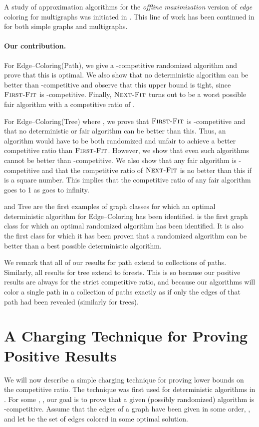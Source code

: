 \documentclass[smallextended]{svjour3}
\def\mck{{\sc Edge--Coloring}\xspace}
\def\mcpath{{\sc Edge--Coloring(Path)}\xspace}
\def\mctree{{\sc Edge--Coloring(Tree)}\xspace}
\def\paths{\text{\sc Path}\xspace}
\newcommand{\NF}{\ensuremath{\operatorname{\textsc{Next-Fit}}}\xspace}
\newcommand{\FF}{\ensuremath{\operatorname{\textsc{First-Fit}}}\xspace}
\begin{document}
A study of approximation algorithms for the {\em offline maximization} version of {\em edge} coloring for multigraphs was initiated in \cite{Faprox}. This line of work has been continued in \cite{aprox1, aprox2, aprox3SIDMA, aprox6} for both simple graphs and multigraphs.

\paragraph{Our contribution.}
For \mcpath, we give a -competitive randomized algorithm and
prove that this is optimal. We also show that no deterministic
algorithm can be better than -competitive and observe that
this upper bound is tight, since \FF is -competitive. 
Finally, \NF turns out to be a worst possible fair algorithm with a competitive ratio of .

For \mctree where , we prove that \FF is
-competitive and that no deterministic or fair
algorithm can be better than this.
Thus, an algorithm would have to be both randomized and unfair to
achieve a better competitive ratio than \FF.
However, we show that even such algorithms cannot be better than
-competitive. 
We also show that
any fair algorithm is -competitive
and that the competitive ratio of \NF is no better than this if  is
a square number.
This implies that the competitive ratio of any fair algorithm goes to
 1 as  goes to infinity.

\paths and {\sc Tree} are the first examples of graph classes
for which 
 an optimal deterministic algorithm for \mck has been identified.
\paths is the first graph class for which an optimal randomized
 algorithm has been identified.
It is also the first class for which it has been proven that a
 randomized algorithm can be better than a best possible deterministic
 algorithm.

We remark that all of our results for {\sc path} extend to collections of paths. Similarly, all results for {\sc tree} extend to forests. This is so because our positive results are always for the strict competitive ratio, and because our algorithms will color a single path in a collection of paths exactly as if only the edges of that path had been revealed (similarly for trees).


\section{A Charging Technique for Proving Positive Results}
\label{lowertech}
We will now describe a simple charging technique for proving lower bounds on the competitive ratio. The technique was first used for deterministic algorithms in \cite{kedge}. 
For some , , our goal is to prove that a given
 (possibly randomized) algorithm  is -competitive. 
Assume that the edges of a graph  have been given in some
 order, , and let  be the set of edges colored in some optimal
 solution. 
\end{document}
